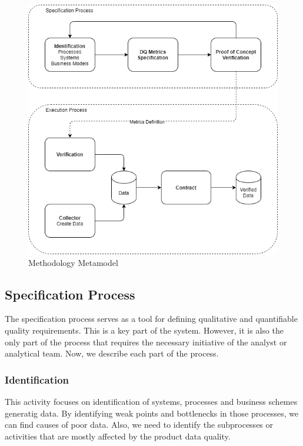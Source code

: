 \begin{figure}[htb]
    \centering
    \includegraphics[width=1\textwidth]{figures/dq-methodology.png}
    \caption{Methodology Metamodel}
    \label{fig:methodology-metamodel}
\end{figure}
\FloatBarrier

\subsection{Specification Process}

The specification process serves as a tool for defining qualitative and quantifiable quality requirements.
This is a key part of the system.
However, it is also the only part of the process that requires the necessary initiative of the analyst or analytical team.
Now, we describe each part of the process.

\subsubsection{Identification}

This activity focuses on identification of systems, processes and business schemes generatig data.
By identifying weak points and bottlenecks in those processes, we can find causes of poor data.
Also, we need to identify the subprocesses or activities that are mostly affected by the product data quality.

